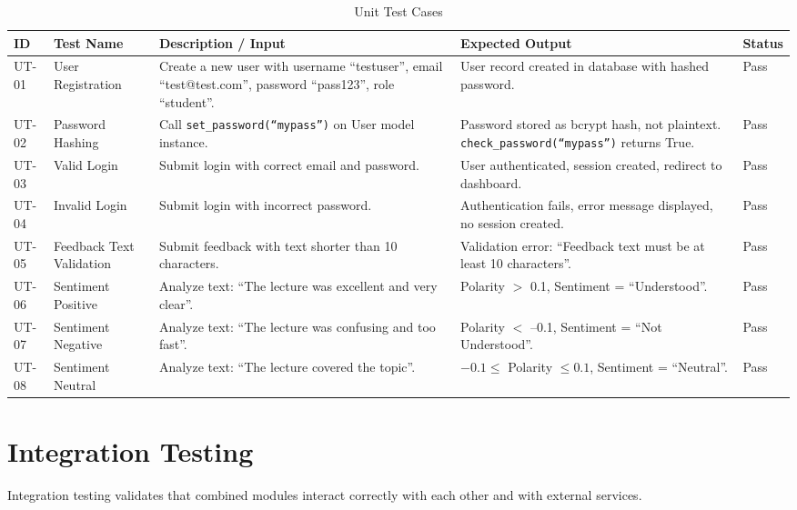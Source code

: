 \begin{table}[H]
\centering
\caption{Unit Test Cases}
\begin{tabularx}{\textwidth}{|p{1.3cm}|p{2.5cm}|X|p{2.5cm}|p{1.2cm}|}
\hline
\textbf{ID} & \textbf{Test Name} & \textbf{Description / Input} & \textbf{Expected Output} & \textbf{Status} \\
\hline
UT-01 & User Registration & Create a new user with username ``testuser'', email ``test@test.com'', password ``pass123'', role ``student''. & User record created in database with hashed password. & Pass \\
\hline
UT-02 & Password Hashing & Call \texttt{set\_password(``mypass'')} on User model instance. & Password stored as bcrypt hash, not plaintext. \texttt{check\_password(``mypass'')} returns True. & Pass \\
\hline
UT-03 & Valid Login & Submit login with correct email and password. & User authenticated, session created, redirect to dashboard. & Pass \\
\hline
UT-04 & Invalid Login & Submit login with incorrect password. & Authentication fails, error message displayed, no session created. & Pass \\
\hline
UT-05 & Feedback Text Validation & Submit feedback with text shorter than 10 characters. & Validation error: ``Feedback text must be at least 10 characters''. & Pass \\
\hline
UT-06 & Sentiment Positive & Analyze text: ``The lecture was excellent and very clear''. & Polarity $>$ 0.1, Sentiment = ``Understood''. & Pass \\
\hline
UT-07 & Sentiment Negative & Analyze text: ``The lecture was confusing and too fast''. & Polarity $<$ --0.1, Sentiment = ``Not Understood''. & Pass \\
\hline
UT-08 & Sentiment Neutral & Analyze text: ``The lecture covered the topic''. & $-0.1 \leq$ Polarity $\leq 0.1$, Sentiment = ``Neutral''. & Pass \\
\hline
\end{tabularx}
\end{table}


\section{Integration Testing}

Integration testing validates that combined modules interact correctly with each other and with external services.


